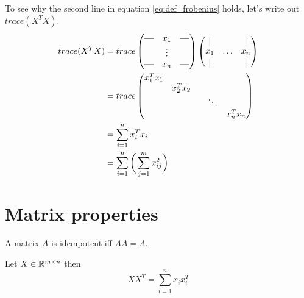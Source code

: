 To see why the second line in equation \ref{eq:def_frobenius}
holds, let's write out $trace(X^TX)$.
\begin{equation}
\begin{split}
trace(X^TX) &= trace
\begin{pmatrix}
\horzbar & x_1 & \horzbar\\
 & \vdots & \\
\horzbar & x_n & \horzbar\\
\end{pmatrix}
\begin{pmatrix}
\vertbar & & \vertbar\\
 x_1 & \hdots & x_n \\
\vertbar & & \vertbar\\
\end{pmatrix}\\
&= trace
\begin{pmatrix}
x_1^Tx_1 & & &\\
& x_2^Tx_2 & &\\
& & & \ddots &\\
& & & & x_n^Tx_n\\
\end{pmatrix}\\
&= \sum_{i = 1}^{n} x_i^Tx_i\\
&= \sum_{i = 1}^{n} \bigg( \sum_{j=1}^{m} x_{ij}^2 \bigg)
\end{split}
\end{equation}

\section*{Matrix properties}
\begin{defn}
A matrix $A$ is idempotent iff $AA = A$.
\end{defn}

\begin{prop}
Let $X \in \mathbb{R}^{m \times n}$ then
\begin{equation}
XX^T = \sum_{i=1}^{n}x_ix_i^T
\end{equation}
\end{prop}

